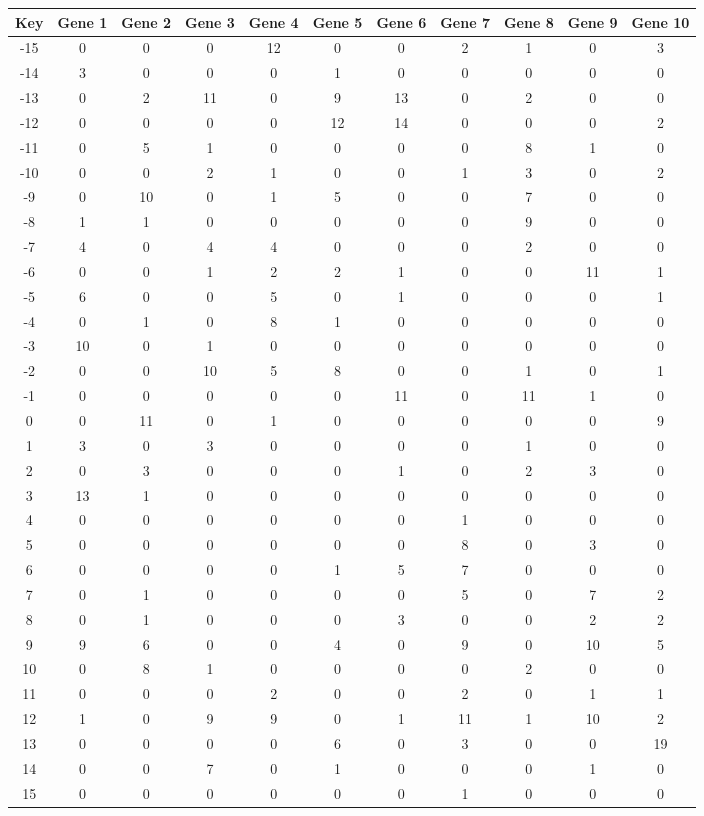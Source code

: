 \begin{tabular}{|c|c|c|c|c|c|c|c|c|c|c|}
\hline
Key & Gene 1 & Gene 2 & Gene 3 & Gene 4 & Gene 5 & Gene 6 & Gene 7 & Gene 8 & Gene 9 & Gene 10 \\
\hline
-15 & 0 & 0 & 0 & 12 & 0 & 0 & 2 & 1 & 0 & 3 \\
-14 & 3 & 0 & 0 & 0 & 1 & 0 & 0 & 0 & 0 & 0 \\
-13 & 0 & 2 & 11 & 0 & 9 & 13 & 0 & 2 & 0 & 0 \\
-12 & 0 & 0 & 0 & 0 & 12 & 14 & 0 & 0 & 0 & 2 \\
-11 & 0 & 5 & 1 & 0 & 0 & 0 & 0 & 8 & 1 & 0 \\
-10 & 0 & 0 & 2 & 1 & 0 & 0 & 1 & 3 & 0 & 2 \\
-9 & 0 & 10 & 0 & 1 & 5 & 0 & 0 & 7 & 0 & 0 \\
-8 & 1 & 1 & 0 & 0 & 0 & 0 & 0 & 9 & 0 & 0 \\
-7 & 4 & 0 & 4 & 4 & 0 & 0 & 0 & 2 & 0 & 0 \\
-6 & 0 & 0 & 1 & 2 & 2 & 1 & 0 & 0 & 11 & 1 \\
-5 & 6 & 0 & 0 & 5 & 0 & 1 & 0 & 0 & 0 & 1 \\
-4 & 0 & 1 & 0 & 8 & 1 & 0 & 0 & 0 & 0 & 0 \\
-3 & 10 & 0 & 1 & 0 & 0 & 0 & 0 & 0 & 0 & 0 \\
-2 & 0 & 0 & 10 & 5 & 8 & 0 & 0 & 1 & 0 & 1 \\
-1 & 0 & 0 & 0 & 0 & 0 & 11 & 0 & 11 & 1 & 0 \\
0 & 0 & 11 & 0 & 1 & 0 & 0 & 0 & 0 & 0 & 9 \\
1 & 3 & 0 & 3 & 0 & 0 & 0 & 0 & 1 & 0 & 0 \\
2 & 0 & 3 & 0 & 0 & 0 & 1 & 0 & 2 & 3 & 0 \\
3 & 13 & 1 & 0 & 0 & 0 & 0 & 0 & 0 & 0 & 0 \\
4 & 0 & 0 & 0 & 0 & 0 & 0 & 1 & 0 & 0 & 0 \\
5 & 0 & 0 & 0 & 0 & 0 & 0 & 8 & 0 & 3 & 0 \\
6 & 0 & 0 & 0 & 0 & 1 & 5 & 7 & 0 & 0 & 0 \\
7 & 0 & 1 & 0 & 0 & 0 & 0 & 5 & 0 & 7 & 2 \\
8 & 0 & 1 & 0 & 0 & 0 & 3 & 0 & 0 & 2 & 2 \\
9 & 9 & 6 & 0 & 0 & 4 & 0 & 9 & 0 & 10 & 5 \\
10 & 0 & 8 & 1 & 0 & 0 & 0 & 0 & 2 & 0 & 0 \\
11 & 0 & 0 & 0 & 2 & 0 & 0 & 2 & 0 & 1 & 1 \\
12 & 1 & 0 & 9 & 9 & 0 & 1 & 11 & 1 & 10 & 2 \\
13 & 0 & 0 & 0 & 0 & 6 & 0 & 3 & 0 & 0 & 19 \\
14 & 0 & 0 & 7 & 0 & 1 & 0 & 0 & 0 & 1 & 0 \\
15 & 0 & 0 & 0 & 0 & 0 & 0 & 1 & 0 & 0 & 0 \\
\hline
\end{tabular}